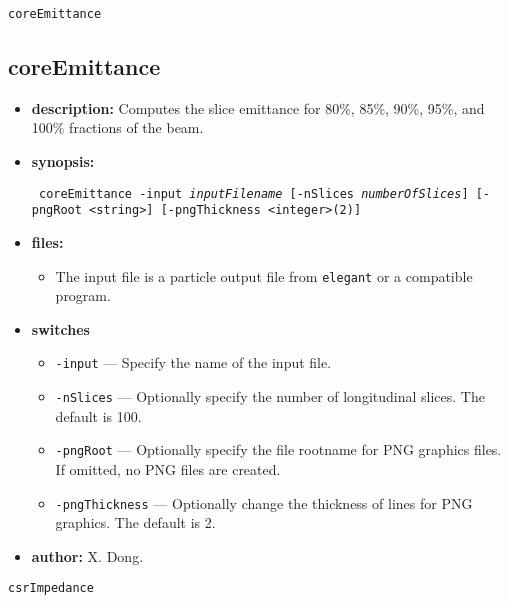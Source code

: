 \documentclass[11pt]{article}
\begin{document}
\newpage
\begin{center}{\Large\verb|coreEmittance|}\end{center}
\subsection{coreEmittance}

\begin{itemize}
\item {\bf description:} Computes the slice emittance for 80\%, 85\%, 90\%, 95\%, and 100\% fractions of the beam.

\item {\bf synopsis:}
\begin{flushleft}{\tt 
coreEmittance -input {\em inputFilename} [-nSlices {\em numberOfSlices}] [-pngRoot <string>] [-pngThickness <integer>(2)]
}
\end{flushleft}

\item {\bf files:}
\begin{itemize}
\item The input file is a particle output file from {\tt elegant} or a compatible program.
\end{itemize}

\item {\bf switches}
\begin{itemize}
\item \verb|-input| --- Specify the name of the input file.
\item \verb|-nSlices| --- Optionally specify the number of longitudinal slices. The default is 100.
\item \verb|-pngRoot| --- Optionally specify the file rootname for PNG graphics files. If omitted, no PNG files are created.
\item \verb|-pngThickness| --- Optionally change the thickness of lines for PNG graphics.  The default is 2.
\end{itemize}

\item {\bf author:} X. Dong.

\end{itemize}

\newpage
\begin{center}{\Large\verb|csrImpedance|}\end{center}
\end{document}
